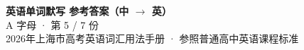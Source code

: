 \documentclass[10pt,a4paper]{article}
\begin{document}
\pagestyle{plain}

\begin{center}
{\LARGE\bfseries 英语单词默写 \quad 参考答案（中 $\to$ 英）}\\[0.22em]
{\large A 字母 · 第 5 / 7 份}\\[0.18em]
{\small 2026年上海市高考英语词汇用法手册 · 参照普通高中英语课程标准}
\end{center}

\vspace{0.2em}
\noindent{\color{rulegray}\rule{\textwidth}{0.8pt}}

\vspace{0.35em}

\vspace{0.25em}
\renewcommand{\arraystretch}{1.32}
\end{document}
